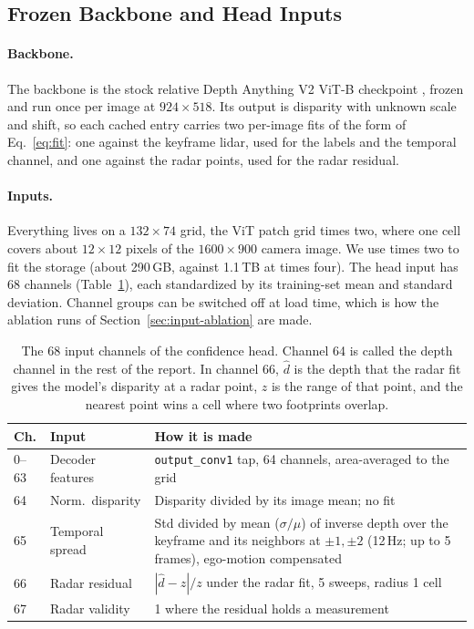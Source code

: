 \subsection{Frozen Backbone and Head Inputs}
\label{sec:inputs}

\paragraph{Backbone.} The backbone is the stock relative Depth Anything V2 ViT-B checkpoint \citep{yang2024depthanythingv2}, frozen and run once per image at $924 \times 518$. Its output is disparity with unknown scale and shift, so each cached entry carries two per-image fits of the form of Eq.~\ref{eq:fit}: one against the keyframe lidar, used for the labels and the temporal channel, and one against the radar points, used for the radar residual.

\paragraph{Inputs.} Everything lives on a $132 \times 74$ grid, the ViT patch grid times two, where one cell covers about $12 \times 12$ pixels of the $1600 \times 900$ camera image. We use times two to fit the storage (about 290\,GB, against 1.1\,TB at times four). The head input has 68 channels (Table~\ref{tab:inputs}), each standardized by its training-set mean and standard deviation. Channel groups can be switched off at load time, which is how the ablation runs of Section~\ref{sec:input-ablation} are made.

\begin{table}[t]
  \centering
  \small
  \setlength{\tabcolsep}{4pt}
  \begin{tabular}{@{}l l p{3.2cm}@{}}
    \toprule
    \textbf{Ch.} & \textbf{Input} & \textbf{How it is made} \\
    \midrule
    0--63 & Decoder features & \texttt{output\_conv1} tap, 64 channels, area-averaged to the grid \\
    64 & Norm.\ disparity & Disparity divided by its image mean; no fit \\
    65 & Temporal spread & Std divided by mean ($\sigma/\mu$) of inverse depth over the keyframe and its neighbors at $\pm1, \pm2$ (12\,Hz; up to 5 frames), ego-motion compensated \\
    66 & Radar residual & $|\hat d - z| / z$ under the radar fit, 5 sweeps, radius 1 cell \\
    67 & Radar validity & 1 where the residual holds a measurement \\
    \bottomrule
  \end{tabular}
  \caption{The 68 input channels of the confidence head. Channel 64 is called the depth channel in the rest of the report. In channel 66, $\hat d$ is the depth that the radar fit gives the model's disparity at a radar point, $z$ is the range of that point, and the nearest point wins a cell where two footprints overlap.}
  \label{tab:inputs}
\end{table}

